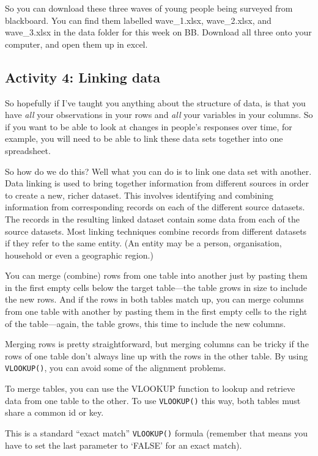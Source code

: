 \documentclass[]{book}
\theoremstyle{definition}
\theoremstyle{definition}
\theoremstyle{definition}
\theoremstyle{remark}
\begin{document}
So you can download these three waves of young people being surveyed
from blackboard. You can find them labelled wave\_1.xlsx, wave\_2.xlsx,
and wave\_3.xlsx in the data folder for this week on BB. Download all
three onto your computer, and open them up in excel.

\hypertarget{activity-4-linking-data}{%
\subsection{Activity 4: Linking data}\label{activity-4-linking-data}}

So hopefully if I've taught you anything about the structure of data, is
that you have \emph{all} your observations in your rows and \emph{all}
your variables in your columns. So if you want to be able to look at
changes in people's responses over time, for example, you will need to
be able to link these data sets together into one spreadsheet.

So how do we do this? Well what you can do is to link one data set with
another. Data linking is used to bring together information from
different sources in order to create a new, richer dataset. This
involves identifying and combining information from corresponding
records on each of the different source datasets. The records in the
resulting linked dataset contain some data from each of the source
datasets. Most linking techniques combine records from different
datasets if they refer to the same entity. (An entity may be a person,
organisation, household or even a geographic region.)

You can merge (combine) rows from one table into another just by pasting
them in the first empty cells below the target table---the table grows
in size to include the new rows. And if the rows in both tables match
up, you can merge columns from one table with another by pasting them in
the first empty cells to the right of the table---again, the table
grows, this time to include the new columns.

Merging rows is pretty straightforward, but merging columns can be
tricky if the rows of one table don't always line up with the rows in
the other table. By using \texttt{VLOOKUP()}, you can avoid some of the
alignment problems.

To merge tables, you can use the VLOOKUP function to lookup and retrieve
data from one table to the other. To use \texttt{VLOOKUP()} this way,
both tables must share a common id or key.

This is a standard ``exact match'' \texttt{VLOOKUP()} formula (remember
that means you have to set the last parameter to `FALSE' for an exact
match).
\end{document}
